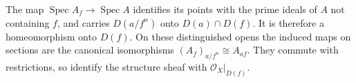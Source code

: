 The map $\operatorname{Spec}A_f\to\operatorname{Spec}A$ identifies its points with the prime ideals of $A$ not containing $f$, and carries $D(a/f^n)$ onto $D(a)\cap D(f)$. It is therefore a homeomorphism onto $D(f)$. On these distinguished opens the induced maps on sections are the canonical isomorphisms $(A_f)_{a/f^n}\cong A_{af}$. They commute with restrictions, so identify the structure sheaf with $\mathcal O_X|_{D(f)}$.
